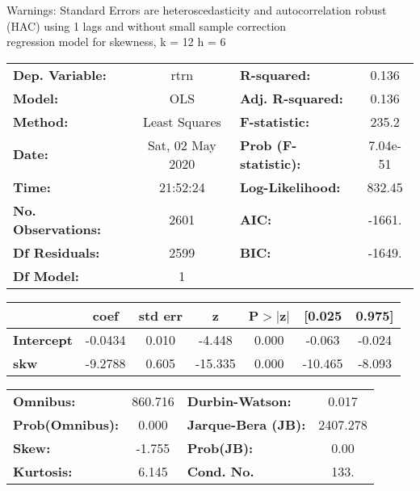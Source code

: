 Warnings: \newline
 [1] Standard Errors are heteroscedasticity and autocorrelation robust (HAC) using 1 lags and without small sample correction\\ 

regression model for skewness, k = 12 h = 6\begin{center}
\begin{tabular}{lclc}
\toprule
\textbf{Dep. Variable:}    &       rtrn       & \textbf{  R-squared:         } &     0.136   \\
\textbf{Model:}            &       OLS        & \textbf{  Adj. R-squared:    } &     0.136   \\
\textbf{Method:}           &  Least Squares   & \textbf{  F-statistic:       } &     235.2   \\
\textbf{Date:}             & Sat, 02 May 2020 & \textbf{  Prob (F-statistic):} &  7.04e-51   \\
\textbf{Time:}             &     21:52:24     & \textbf{  Log-Likelihood:    } &    832.45   \\
\textbf{No. Observations:} &        2601      & \textbf{  AIC:               } &    -1661.   \\
\textbf{Df Residuals:}     &        2599      & \textbf{  BIC:               } &    -1649.   \\
\textbf{Df Model:}         &           1      & \textbf{                     } &             \\
\bottomrule
\end{tabular}
\begin{tabular}{lcccccc}
                   & \textbf{coef} & \textbf{std err} & \textbf{z} & \textbf{P$> |$z$|$} & \textbf{[0.025} & \textbf{0.975]}  \\
\midrule
\textbf{Intercept} &      -0.0434  &        0.010     &    -4.448  &         0.000        &       -0.063    &       -0.024     \\
\textbf{skw}       &      -9.2788  &        0.605     &   -15.335  &         0.000        &      -10.465    &       -8.093     \\
\bottomrule
\end{tabular}
\begin{tabular}{lclc}
\textbf{Omnibus:}       & 860.716 & \textbf{  Durbin-Watson:     } &    0.017  \\
\textbf{Prob(Omnibus):} &   0.000 & \textbf{  Jarque-Bera (JB):  } & 2407.278  \\
\textbf{Skew:}          &  -1.755 & \textbf{  Prob(JB):          } &     0.00  \\
\textbf{Kurtosis:}      &   6.145 & \textbf{  Cond. No.          } &     133.  \\
\bottomrule
\end{tabular}
\end{center}

